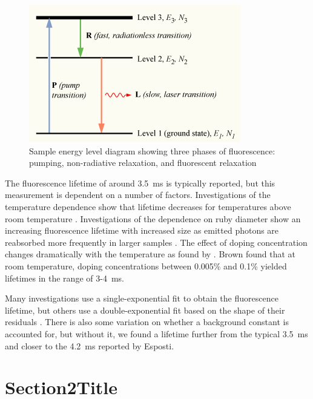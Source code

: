 \documentclass[12pt, a4paper, twocolumn]{article}
\begin{document}
\begin{figure}[t]
\includegraphics[width=\linewidth]{Population-inversion-3level.png}
\caption{Sample energy level diagram showing three phases of fluorescence: pumping, non-radiative relaxation, and fluorescent relaxation}
\label{fig:populationInversion}
\end{figure}

The fluorescence lifetime of around \SI{3.5}{\ms} is typically reported, but this measurement is dependent on a number of factors. Investigations of the temperature dependence show that lifetime decreases for temperatures above room temperature \cite{Seat, Nelson}. Investigations of the dependence on ruby diameter show an increasing fluorescence lifetime with increased size as emitted photons are reabsorbed more frequently in larger samples \cite{Jones}. The effect of doping concentration changes dramatically with the temperature as found by \cite{Brown}. Brown found that at room temperature, doping concentrations between 0.005\% and 0.1\% yielded lifetimes in the range of 3-\SI{4}{\ms}.


Many investigations use a single-exponential fit to obtain the fluorescence lifetime, but others use a double-exponential fit based on the shape of their residuals \cite{McBane, Jones}. There is also some variation on whether a background constant is accounted for, but without it, we found a lifetime further from the typical \SI{3.5}{\ms} and closer to the \SI{4.2}{\ms} reported by Esposti.

\section{Section2Title}
\lipsum[1]

\nocite{*}


\end{document}
